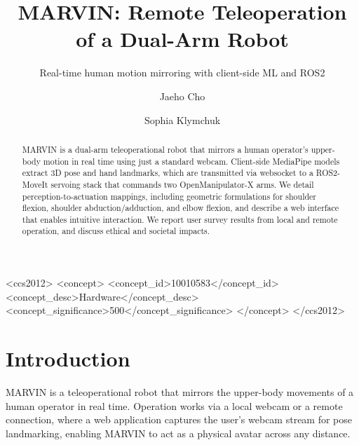 \documentclass[acmsmall, screen]{acmart}
\begin{document}
\title{MARVIN: Remote Teleoperation of a Dual-Arm Robot}
\subtitle{Real-time human motion mirroring with client-side ML and ROS2}

\author{Jaeho Cho}
\author{Sophia Klymchuk}
\authornotemark[1]

\renewcommand{\shortauthors}{Cho and Klymchuk}

\begin{abstract}
MARVIN is a dual-arm teleoperational robot that mirrors a human operator's upper-body motion in real time using just a standard webcam. Client-side MediaPipe models extract 3D pose and hand landmarks, which are transmitted via websocket to a ROS2-MoveIt servoing stack that commands two OpenManipulator-X arms. We detail perception-to-actuation mappings, including geometric formulations for shoulder flexion, shoulder abduction/adduction, and elbow flexion, and describe a web interface that enables intuitive interaction. We report user survey results from local and remote operation, and discuss ethical and societal impacts.
\end{abstract}

\begin{CCSXML}
<ccs2012>
   <concept>
       <concept_id>10010583</concept_id>
       <concept_desc>Hardware</concept_desc>
       <concept_significance>500</concept_significance>
       </concept>
 </ccs2012>
\end{CCSXML}




\maketitle

\section{Introduction}
MARVIN is a teleoperational robot that mirrors the upper-body movements of a human operator in real time. Operation works via a local webcam or a remote connection, where a web application captures the user's webcam stream for pose landmarking, enabling MARVIN to act as a physical avatar across any distance.
\end{document}
